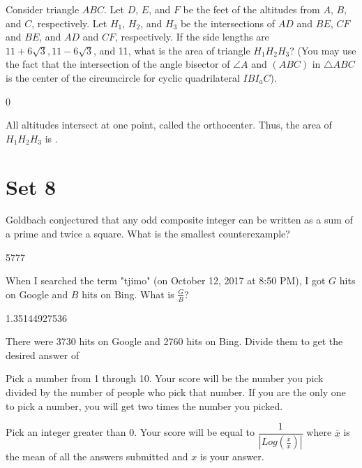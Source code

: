 \documentclass[11pt]{article}
\begin{document}
\begin{problem} %
Consider triangle $ABC$. Let $D$, $E$, and $F$ be the feet of the altitudes from $A$, $B$, and $C$, respectively. Let $H_1$, $H_2$, and $H_3$ be the intersections of $AD$ and $BE$, $CF$ and $BE$, and $AD$ and $CF$, respectively. If the side lengths are $11+6\sqrt{3}, 11-6\sqrt{3}$, and 11, what is the area of triangle $H_1H_2H_3$? (You may use the fact that the intersection of the angle bisector of $\angle{A}$ and $(ABC)$ in $\triangle{ABC}$ is the center of the circumcircle for cyclic quadrilateral $IBI_aC$).
\end{problem}

\begin{answer}
0
\end{answer}

\begin{solution}
All altitudes intersect at one point, called the orthocenter. Thus, the area of $H_1H_2H_3$ is .
\end{solution}
\newpage
\section*{Set 8}
\begin{problem}
Goldbach conjectured that any odd composite integer can be written as a sum of a prime and twice a square. What is the smallest counterexample?
\end{problem}

\begin{answer}
5777
\end{answer}

\begin{problem}
When I searched the term "tjimo" (on October 12, 2017 at 8:50 PM), I got $G$ hits on Google and $B$ hits on Bing. What is $\frac{G}{B}$?
\end{problem}

\begin{answer}
1.35144927536
\end{answer}

\begin{solution}
There were 3730 hits on Google and 2760 hits on Bing. Divide them to get the desired answer of
\end{solution}

\begin{problem}
Pick a number from 1 through 10. Your score will be the number you pick divided by the number of people who pick that number. If you are the only one to pick a number, you will get two times the number you picked.
\end{problem}

\begin{problem}
Pick an integer greater than 0. Your score will be equal to $\dfrac{1}{|Log(\frac{\overline{x}}{x})|}$ where $\overline{x}$ is the mean of all the answers submitted and $x$ is your answer.
\end{problem}
\end{document}
